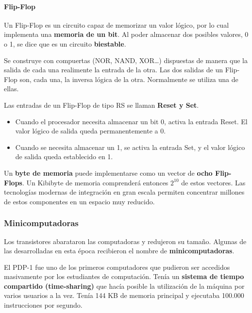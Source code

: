\documentclass[spanish,A4,]{article}
\begin{document}
\paragraph{Flip-Flop}\label{flip-flop}

Un Flip-Flop es un circuito capaz de memorizar un valor lógico, por lo
cual implementa una \textbf{memoria de un bit}. Al poder almacenar dos
posibles valores, 0 o 1, se dice que es un circuito \textbf{biestable}.

Se construye con compuertas (NOR, NAND, XOR\ldots{}) dispuestas de
manera que la salida de cada una realimente la entrada de la otra. Las
dos salidas de un Flip-Flop son, cada una, la inversa lógica de la otra.
Normalmente se utiliza una de ellas.

Las entradas de un Flip-Flop de tipo RS se llaman \textbf{Reset y Set}.

\begin{itemize}
\itemsep1pt\parskip0pt
\item
  Cuando el procesador necesita almacenar un bit 0, activa la entrada
  Reset. El valor lógico de salida queda permanentemente a 0.
\item
  Cuando se necesita almacenar un 1, se activa la entrada Set, y el
  valor lógico de salida queda establecido en 1.
\end{itemize}

Un \textbf{byte de memoria} puede implementarse como un vector de
\textbf{ocho Flip-Flops}. Un Kibibyte de memoria comprenderá entonces
$2^{10}$ de estos vectores. Las tecnologías modernas de integración en
gran escala permiten concentrar millones de estos componentes en un
espacio muy reducido.

\subsubsection{Minicomputadoras}\label{minicomputadoras}

Los transistores abarataron las computadoras y redujeron su tamaño.
Algunas de las desarrolladas en esta época recibieron el nombre de
\textbf{minicomputadoras}.

El PDP-1 fue uno de los primeros computadores que pudieron ser accedidos
masivamente por los estudiantes de computación. Tenía un \textbf{sistema
de tiempo compartido (time-sharing)} que hacía posible la utilización de
la máquina por varios usuarios a la vez. Tenía 144 KB de memoria
principal y ejecutaba 100.000 instrucciones por segundo.
\end{document}
